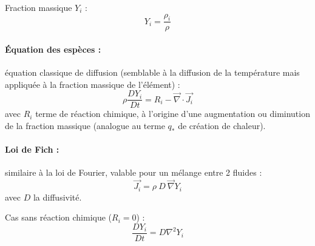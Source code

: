 Fraction massique $Y_i$ :
%
\begin{equation}
    Y_i = \frac{\rho_i}{\rho}
\end{equation}

\paragraph{Équation des espèces :} équation classique de diffusion (semblable à la diffusion de la température mais appliquée à la fraction massique de l'élément) :
%
\begin{equation}
    \rho \frac{DY_i}{Dt} = R_i - \vec{\nabla} \cdot \vec{J_i}
\end{equation}
%
avec $R_i$ terme de réaction chimique, à l'origine d'une augmentation ou diminution de la fraction massique (analogue au terme $q_*$ de création de chaleur).

\paragraph{Loi de Fich :}similaire à la loi de Fourier, valable pour un mélange entre 2 fluides :
%
\begin{equation}
    \vec{J_i} = \rho~D~\vec{\nabla} Y_i
\end{equation}
%
avec $D$ la diffusivité.

Cas sans réaction chimique ($R_i=0$) :
%
\begin{equation}
    \frac{DY_i}{Dt} = D \nabla^2 Y_i
\end{equation}

